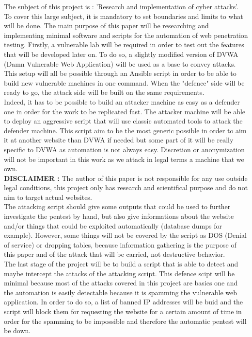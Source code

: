 The subject of this project is : 'Research and implementation of cyber attacks'. To cover this large subject, it is mandatory to set boundaries and limits to what will be done.
The main purpose of this paper will be researching and implementing minimal software and scripts for the automation of web penetration testing. Firstly, a vulnerable lab will be required in order to test out the features that will be developed later on. To do so, a slightly modified version of DVWA (Damn Vulnerable Web Application) will be used as a base to convey attacks. This setup will all be possible through an Ansible script in order to be able to build new vulnerable machines in one command. When the "defence" side will be ready to go, the attack side will be built on the same requirements. \\ Indeed, it has to be possible to build an attacker machine as easy as a defender one in order for the work to be replicated fast. The attacker machine will be able to deploy an aggressive script that will use classic automated tools to attack the defender machine. This script aim to be the most generic possible in order to aim it at another website than DVWA if needed but some part of it will be really specific to DVWA as automation is not always easy. Discretion or anonymization will not be important in this work as we attack in legal terms a machine that we own. \\ 
\textbf{DISCLAIMER :} The author of this paper is not responsible for any use outside legal conditions, this project only has research and scientifical purpose and do not aim to target actual websites. \\
The attacking script should give some outputs that could be used to further investigate the pentest by hand, but also give informations about the website and/or things that could be exploited automatically (database dumps for example). However, some things will not be covered by the script as DOS (Denial of service) or dropping tables, because information gathering is the purpose of this paper and of the attack that will be carried, not destructive behavior. \\
The last stage of the project will be to build a script that is able to detect and maybe intercept the attacks of the attacking script. This defence scipt will be minimal because most of the attacks covered in this project are basics one and the automation is easily detectable because it is spamming the vulnerable web application. In order to do so, a list of banned IP addresses will be buid and the script will block them for requesting the website for a certain amount of time in order for the spamming to be impossible and therefore the automatic pentest will be down.